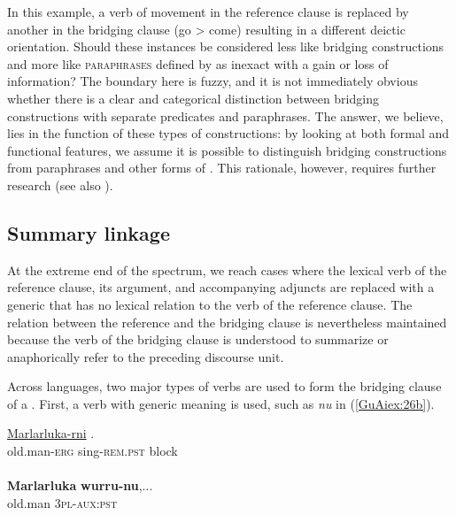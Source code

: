 \documentclass[output=paper]{LSP/langsci}
\begin{document}
\noindent
In this example, a verb of movement in the reference clause is replaced by another in the bridging clause (go > come) resulting in a different deictic orientation. Should these instances be considered less like bridging constructions and more like \textsc{paraphrases} defined by \citet[][382--383]{longacre07} as inexact  with a gain or loss of information? The boundary here is fuzzy, and it is not immediately obvious whether there is a clear and categorical distinction between bridging constructions with separate predicates and paraphrases. The answer, we believe, lies in the function of these types of constructions: by looking at both formal and functional features, we assume it is possible to distinguish bridging constructions from paraphrases and other forms of . This rationale, however, requires further research (see also ).

\subsection{Summary linkage}
\label{GuAi32summ.link}
At the extreme end of the  spectrum, we reach cases where the lexical verb of the reference clause, its argument, and accompanying adjuncts are replaced with a generic  that has no lexical relation to the verb of the reference clause. The relation between the reference and the bridging clause is nevertheless maintained because the verb of the bridging clause is understood to summarize or anaphorically refer to the preceding discourse unit.

Across languages, two major types of verbs are used to form the bridging clause of a . First, a verb with generic meaning is used, such as \textit{nu} in (\ref{GuAiex:26b}).

\begin{exe}
\ex \label{GuAiex:26ab}
 {\citealt{Pensalfini}}
\begin{xlist}
\ex \label{GuAiex:26a}
\gll \underline{Marlarluka-rni}    \underline{}  \underline{}. \\
old.man-\textsc{erg}     sing-\textsc{rem.pst}    block\\
\glt {} \\
\ex \label{GuAiex:26b}
\gll  \textbf{Marlarluka}   \textbf{wurru-nu},...\\
 old.man   \textsc{3pl}-\textsc{aux:pst}\\
\glt {} 
\end{xlist}
\end{exe}
\end{document}

